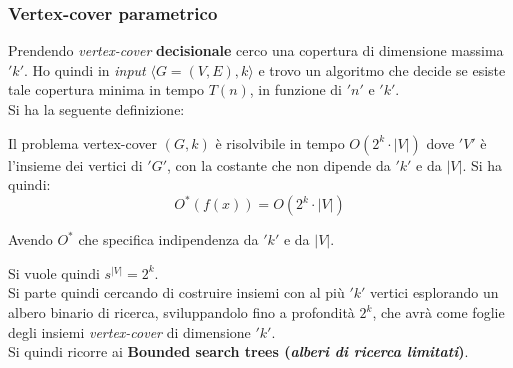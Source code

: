 										\subsubsection{Vertex-cover parametrico}
										Prendendo \textit{vertex-cover} \textbf{decisionale} cerco una copertura di
										dimensione massima $ 'k' $. Ho quindi in \textit{input} $\langle G=(V,E),k\rangle$ e trovo un
										algoritmo che decide se esiste tale copertura minima in tempo $T(n)$, in
										funzione di $ 'n' $ e $ 'k' $.\\
										Si ha la seguente definizione:
										\begin{definizione}
											Il problema vertex-cover $(G,k)$ è risolvibile in tempo $O(2^k\cdot |V|)$ dove
											$ 'V' $ è l'insieme dei vertici di $ 'G' $, con la costante che non dipende da $ 'k' $ e
											da $|V|$. Si ha quindi:
											\[O^*(f(x))=O(2^k\cdot |V|)\]
											\begin{nota}
											    Avendo $O^*$ che specifica indipendenza da $ 'k' $ e da $|V|$.
											\end{nota}
										\end{definizione}
										Si vuole quindi $s^{|V|}=2^k$.\\
										Si parte quindi cercando di costruire insiemi con al più $ 'k' $ vertici esplorando
										un albero binario di ricerca, sviluppandolo fino a profondità $2^k$, che avrà
										come foglie degli insiemi \textit{vertex-cover} di dimensione $ 'k' $.\\
										Si quindi ricorre ai \textbf{Bounded search trees (\textit{alberi di ricerca
										limitati})}.
